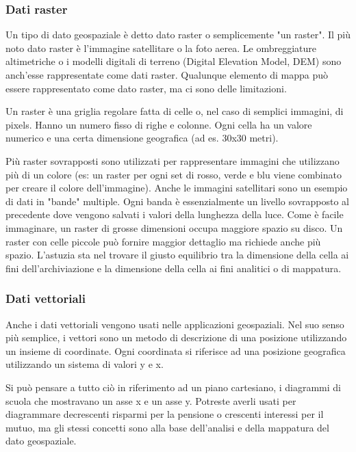\subsubsection{Dati raster}\label{label_rasterdata}

Un tipo di dato geospaziale è detto dato raster o semplicemente "un
raster". Il più noto dato raster è l'immagine satellitare o la foto
aerea. Le ombreggiature altimetriche o i modelli digitali di terreno (Digital Elevation Model, DEM)
sono anch'esse rappresentate come dati raster. Qualunque elemento di mappa può essere
rappresentato come dato raster, ma ci sono delle limitazioni.

Un raster è una griglia regolare fatta di celle o, nel caso di semplici
immagini, di pixels. Hanno un numero fisso di righe e colonne.
Ogni cella ha un valore numerico e una certa dimensione geografica
(ad es. 30x30 metri).

Più raster sovrapposti sono utilizzati per rappresentare immagini che utilizzano
più di un colore (es: un raster per ogni set di rosso, verde e blu viene combinato
per creare il colore dell’immagine). Anche le immagini satellitari sono un esempio
di dati in "bande" multiple. Ogni banda è essenzialmente un livello sovrapposto
al precedente dove vengono salvati i valori della lunghezza della luce. Come è
facile immaginare, un raster di grosse dimensioni occupa maggiore spazio su disco.
Un raster con celle piccole può fornire maggior dettaglio ma richiede anche più spazio.
L'astuzia sta nel trovare il giusto equilibrio tra la dimensione della cella
ai fini dell'archiviazione e la dimensione della cella ai fini analitici
o di mappatura.

\subsubsection{Dati vettoriali}\label{label_vectordata}

Anche i dati vettoriali vengono usati nelle applicazioni geospaziali.
Nel suo senso più semplice, i vettori sono un metodo di descrizione
di una posizione utilizzando un insieme di coordinate. Ogni coordinata
si riferisce ad una posizione geografica utilizzando un sistema di valori y e x.

Si può pensare a tutto ciò in riferimento ad un piano cartesiano,
i diagrammi di scuola che mostravano un asse x e un asse y. Potreste
averli usati per diagrammare decrescenti risparmi per la pensione
o crescenti interessi per il mutuo, ma gli stessi concetti sono alla
base dell'analisi e della mappatura del dato geospaziale.

